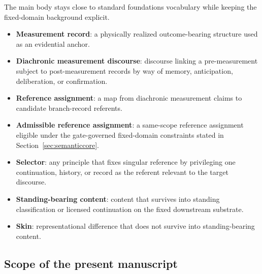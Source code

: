 The main body stays close to standard foundations vocabulary while keeping the fixed-domain
background explicit.

\begin{itemize}
    \item \textbf{Measurement record}: a physically realized outcome-bearing structure used as an
    evidential anchor.
    \item \textbf{Diachronic measurement discourse}: discourse linking a pre-measurement subject to
    post-measurement records by way of memory, anticipation, deliberation, or confirmation.
    \item \textbf{Reference assignment}: a map from diachronic measurement claims to candidate
    branch-record referents.
    \item \textbf{Admissible reference assignment}: a same-scope reference assignment eligible under the
    gate-governed fixed-domain constraints stated in Section~\ref{sec:semanticcore}.
    \item \textbf{Selector}: any principle that fixes singular reference by privileging one continuation,
    history, or record as the referent relevant to the target discourse.
    \item \textbf{Standing-bearing content}: content that survives into standing classification or licensed
    continuation on the fixed downstream substrate.
    \item \textbf{Skin}: representational difference that does not survive into standing-bearing content.
\end{itemize}

\subsection{Scope of the present manuscript}


